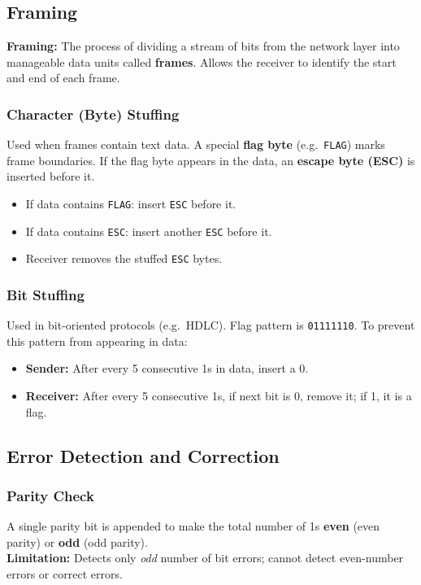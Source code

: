 \documentclass[12pt,a4paper]{article}
\begin{document}
\subsection{Framing}

\begin{tcolorbox}[defbox]
\textbf{Framing:} The process of dividing a stream of bits from the network layer into manageable data units called \textbf{frames}. Allows the receiver to identify the start and end of each frame.
\end{tcolorbox}

\subsubsection*{Character (Byte) Stuffing}
Used when frames contain text data. A special \textbf{flag byte} (e.g.\ \texttt{FLAG}) marks frame boundaries. If the flag byte appears in the data, an \textbf{escape byte (ESC)} is inserted before it.
\begin{itemize}[leftmargin=*, itemsep=2pt]
  \item If data contains \texttt{FLAG}: insert \texttt{ESC} before it.
  \item If data contains \texttt{ESC}: insert another \texttt{ESC} before it.
  \item Receiver removes the stuffed \texttt{ESC} bytes.
\end{itemize}

\subsubsection*{Bit Stuffing}
Used in bit-oriented protocols (e.g.\ HDLC). Flag pattern is \texttt{01111110}. To prevent this pattern from appearing in data:
\begin{itemize}[leftmargin=*, itemsep=2pt]
  \item \textbf{Sender:} After every 5 consecutive 1s in data, insert a 0.
  \item \textbf{Receiver:} After every 5 consecutive 1s, if next bit is 0, remove it; if 1, it is a flag.
\end{itemize}

\subsection{Error Detection and Correction}

\subsubsection*{Parity Check}
\begin{tcolorbox}[formulabox, title={\textbf{Parity Check}}]
A single parity bit is appended to make the total number of 1s \textbf{even} (even parity) or \textbf{odd} (odd parity).\\
\textbf{Limitation:} Detects only \textit{odd} number of bit errors; cannot detect even-number errors or correct errors.
\end{tcolorbox}
\end{document}
